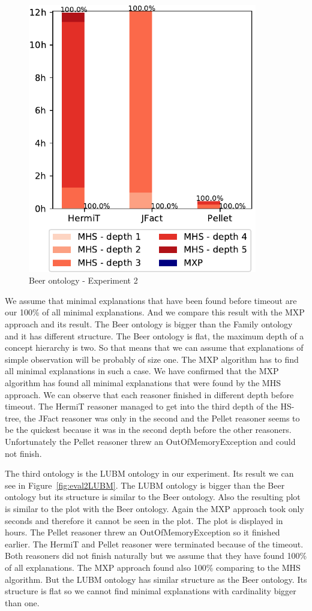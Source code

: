 \documentclass[12pt,a4paper]{article}
\begin{document}
\begin{figure}[H]
	\centering
	\includegraphics[width=10cm]{eval2Beer} 
	\caption{Beer ontology - Experiment 2}
	\label{fig:eval2Beer}
\end{figure}

We assume that minimal explanations that have been found before timeout are our 100\% of all minimal explanations. And we compare this result with the MXP approach and its result. The Beer ontology is bigger than the Family ontology and it has different structure. The Beer ontology is flat, the maximum depth of a concept hierarchy is two. So that means that we can assume that explanations of simple observation will be probably of size one. The MXP algorithm has to find all minimal explanations in such a case. We have confirmed that the MXP algorithm has found all minimal explanations that were found by the MHS approach. We can observe that each reasoner finished in different depth before timeout. The HermiT reasoner managed to get into the third depth of the HS-tree, the JFact reasoner was only in the second and the Pellet reasoner seems to be the quickest because it was in the second depth before the other reasoners. Unfortunately the Pellet reasoner threw an OutOfMemoryException and could not finish.


The third ontology is the LUBM ontology in our experiment. Its result we can see in Figure~\ref{fig:eval2LUBM}. The LUBM ontology is bigger than the Beer ontology but its structure is similar to the Beer ontology. Also the resulting plot is similar to the plot with the Beer ontology. Again the MXP approach took only seconds and therefore it cannot be seen in the plot. The plot is displayed in hours. The Pellet reasoner threw an OutOfMemoryException so it finished earlier. The HermiT and Pellet reasoner were terminated because of the timeout. Both reasoners did not finish naturally but we assume that they have found 100\% of all explanations. The MXP approach found also 100\% comparing to the MHS algorithm. But the LUBM ontology has similar structure as the Beer ontology. Its structure is flat so we cannot find minimal explanations with cardinality bigger than one.
\end{document}
